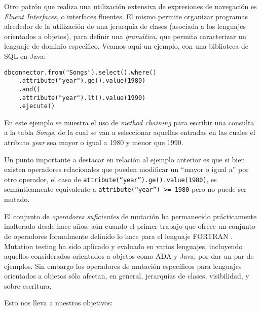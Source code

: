 Otro patr\'on que realiza una utilizaci\'on extensiva de expresiones de navegaci\'on es \emph{Fluent Interfaces}, o interfaces fluentes. El mismo permite organizar programas alrededor de la utilizaci\'on de una jerarqu\'ia de clases (asociada a los lenguajes orientados a objetos), para definir una \emph{gram\'atica}, que permita caracterizar un lenguaje de dominio espec\'ifico. Veamos aqu\'i un ejemplo, con una biblioteca de SQL en Java:
\begin{center}
	\begin{lstlisting}[mathescape=true]
	dbconnector.from("Songs").select().where()
	.attribute("year").ge().value(1980)
	.and()
	.attribute("year").lt().value(1990)
	.ejecute()
	\end{lstlisting}
\end{center}
En este ejemplo se muestra el uso de \emph{method chaining} para escribir una consulta a la tabla \emph{Songs}, de la cual se van a seleccionar aquellas entradas en las cuales el atributo \emph{year} sea mayor o igual a 1980 y menor que 1990.

Un punto importante a destacar en relaci\'on al ejemplo anterior es que si bien existen operadores relacionales que pueden modificar un ``mayor o igual a'' por otro operador, el caso de \texttt{attribute(``year'').ge().value(1980)}, es sem\'anticamente equivalente a \texttt{attribute(``year'') >= 1980} pero no puede ser mutado.

El conjunto de \emph{operadores suficientes} de mutaci\'on ha permanecido pr\'acticamente inalterado desde hace a\~nos, a\'un cuando el primer trabajo que ofrece un conjunto de operadores formalmente definido lo hace para el lenguaje FORTRAN \cite{bibliography.mutation.definitions.fortranOffut87, bibliography.mutation.definitions.fortranKing91}. Mutation testing ha sido aplicado y evaluado en varios lenguajes, incluyendo aquellos considerados orientados a objetos como ADA y Java, por dar un par de ejemplos. Sin embargo los operadores de mutaci\'on espec\'ificos para lenguajes orientados a objetos s\'olo afectan, en general, jerarqu\'ias de clases, visibilidad, y sobre-escritura. 

Esto nos lleva a nuestros objetivos:

